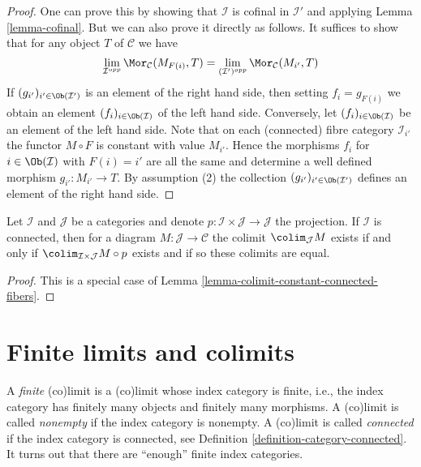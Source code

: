 \begin{proof}
One can prove this by showing that $\mathcal{I}$ is cofinal in
$\mathcal{I}'$ and applying Lemma \ref{lemma-cofinal}.
But we can also prove it directly as follows.
It suffices to show that for any object $T$ of $\mathcal{C}$ we have
$$
\lim_{\mathcal{I}^{opp}} \Mor_\mathcal{C}(M_{F(i)}, T)
=
\lim_{(\mathcal{I}')^{opp}} \Mor_\mathcal{C}(M_{i'}, T)
$$
If $(g_{i'})_{i' \in \Ob(\mathcal{I}')}$ is an element of
the right hand side, then setting $f_i = g_{F(i)}$ we obtain an
element $(f_i)_{i \in \Ob(\mathcal{I})}$ of the left hand side.
Conversely, let $(f_i)_{i \in \Ob(\mathcal{I})}$ be an element of the
left hand side. Note that on each (connected)
fibre category $\mathcal{I}_{i'}$ the functor $M \circ F$
is constant with value $M_{i'}$. Hence the morphisms
$f_i$ for $i \in \Ob(\mathcal{I})$ with $F(i) = i'$
are all the same and determine a well defined morphism
$g_{i'} : M_{i'} \to T$. By assumption (2) the collection
$(g_{i'})_{i' \in \Ob(\mathcal{I}')}$ defines an element
of the right hand side.
\end{proof}

\begin{lemma}
\label{lemma-product-with-connected}
Let $\mathcal{I}$ and $\mathcal{J}$ be a categories and denote
$p : \mathcal{I} \times \mathcal{J} \to \mathcal{J}$ the projection.
If $\mathcal{I}$ is connected, then for a diagram
$M : \mathcal{J} \to \mathcal{C}$ the colimit $\colim_\mathcal{J} M$ exists
if and only if $\colim_{\mathcal{I} \times \mathcal{J}} M \circ p$ exists and
if so these colimits are equal.
\end{lemma}

\begin{proof}
This is a special case of Lemma \ref{lemma-colimit-constant-connected-fibers}.
\end{proof}






\section{Finite limits and colimits}
\label{section-finite-limits}

\noindent
A {\it finite} (co)limit is a (co)limit whose index category is finite,
i.e., the index category has finitely many objects and finitely many
morphisms. A (co)limit is called {\it nonempty} if the index category is
nonempty. A (co)limit is called {\it connected} if the index category is
connected, see
Definition \ref{definition-category-connected}.
It turns out that there are ``enough'' finite index categories.

